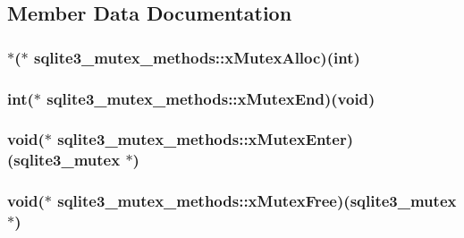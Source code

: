 \subsection{Member Data Documentation}
\hypertarget{structsqlite3__mutex__methods_a1092d5c1659c494c5235e884def5e275}{
\subsubsection[{x\-Mutex\-Alloc}]{ $\ast$($\ast$ sqlite3\-\_\-mutex\-\_\-methods\-::x\-Mutex\-Alloc)(int)}}\label{structsqlite3__mutex__methods_a1092d5c1659c494c5235e884def5e275}
\hypertarget{structsqlite3__mutex__methods_a4963efb4bfede244d4d2a14510dbfe68}{
\subsubsection[{x\-Mutex\-End}]{\setlength{\rightskip}{0pt plus 5cm}int($\ast$ sqlite3\-\_\-mutex\-\_\-methods\-::x\-Mutex\-End)(void)}}\label{structsqlite3__mutex__methods_a4963efb4bfede244d4d2a14510dbfe68}
\hypertarget{structsqlite3__mutex__methods_ac60f7bb165e9770949a8a2b2c2632830}{
\subsubsection[{x\-Mutex\-Enter}]{\setlength{\rightskip}{0pt plus 5cm}void($\ast$ sqlite3\-\_\-mutex\-\_\-methods\-::x\-Mutex\-Enter)({\bf sqlite3\-\_\-mutex} $\ast$)}}\label{structsqlite3__mutex__methods_ac60f7bb165e9770949a8a2b2c2632830}
\hypertarget{structsqlite3__mutex__methods_a4e58d446a7225ce91073eb0af91d219a}{
\subsubsection[{x\-Mutex\-Free}]{\setlength{\rightskip}{0pt plus 5cm}void($\ast$ sqlite3\-\_\-mutex\-\_\-methods\-::x\-Mutex\-Free)({\bf sqlite3\-\_\-mutex} $\ast$)}}\label{structsqlite3__mutex__methods_a4e58d446a7225ce91073eb0af91d219a}
